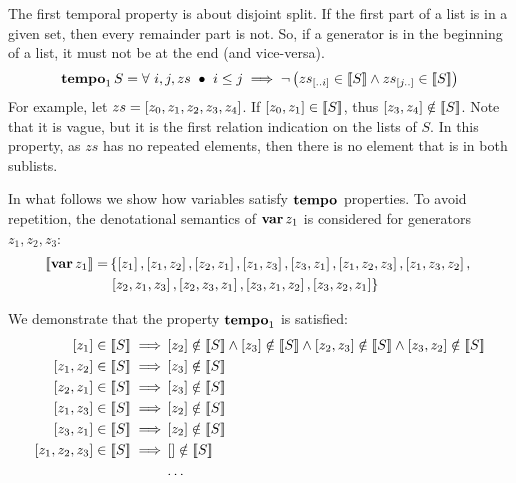 The first temporal property is about disjoint split.
If the first part of a list is in a given set, then every remainder part is not.
So, if a generator is in the beginning of a list, it must not be at the end (and vice-versa).
%
\begin{equation}
\tempo[1]{S} = \forall~ i, j, zs ~\bullet~
i \le j \implies
\lnot \left(
\sliceright{zs}{i} \in \denote{S} \land \sliceleft{zs}{j} \in \denote{S}
\right)\label{def:tempo1}
\end{equation}
%
For example, let $zs = \listsin{z_0,z_1,z_2,z_3,z_4}$.
If $\listsin{z_0,z_1} \in \denote{S}$, thus $\listsin{z_3,z_4} \notin \denote{S}$.
Note that it is vague, but it is the first relation indication on the lists of $S$.
In this property, as $zs$ has no repeated elements, then there is no element that is in both sublists.

In what follows we show how variables satisfy $\tempo[]{}$ properties.
To avoid repetition, the denotational semantics of $\var{z_1}$ is considered for generators $z_1,z_2,z_3$:
%
\begin{align}
\denote{\var{z_1}} = & 
\left\{
\listsin{z_1}, 
\listsin{z_1,z_2},\listsin{z_2,z_1},
\listsin{z_1,z_3},\listsin{z_3,z_1},
\listsin{z_1,z_2,z_3},\listsin{z_1,z_3,z_2},
\right.
\nonumber\\
&
\left.
\listsin{z_2,z_1,z_3},\listsin{z_2,z_3,z_1},
\listsin{z_3,z_1,z_2},\listsin{z_3,z_2,z_1}
\right\}
\end{align}

We demonstrate that the property $\tempo[1]{}$ is satisfied:
\begin{align}
\listsin{z_1} \in \denote{S} \implies & 
\listsin{z_2} \notin \denote{S} \land
\listsin{z_3} \notin \denote{S} \land
\listsin{z_2,z_3}\notin \denote{S} \land
\listsin{z_3,z_2}\notin \denote{S}\nonumber\\
\listsin{z_1,z_2} \in \denote{S} \implies &
\listsin{z_3} \notin \denote{S}\nonumber\\
\listsin{z_2,z_1} \in \denote{S} \implies &
\listsin{z_3} \notin \denote{S}\nonumber\\
\listsin{z_1,z_3} \in \denote{S} \implies &
\listsin{z_2} \notin \denote{S}\nonumber\\
\listsin{z_3,z_1} \in \denote{S} \implies &
\listsin{z_2} \notin \denote{S}\nonumber\\
\listsin{z_1,z_2,z_3} \in \denote{S} \implies &
\listsin{} \notin \denote{S}\nonumber\\
&\ldots\nonumber
\end{align}


